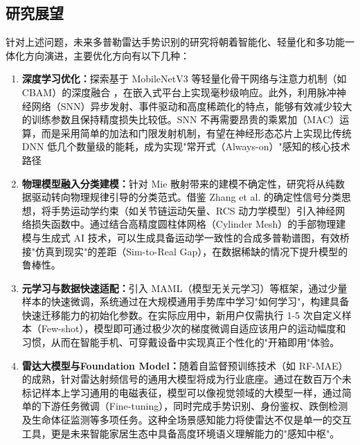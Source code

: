 \subsection{研究展望}
针对上述问题，未来多普勒雷达手势识别的研究将朝着智能化、轻量化和多功能一体化方向演进，主要优化方向有以下几种：
\begin{enumerate}
    \item \textbf{深度学习优化：}探索基于 MobileNetV3 等轻量化骨干网络与注意力机制（如 CBAM）的深度融合 ，在嵌入式平台上实现毫秒级响应。此外，利用脉冲神经网络（SNN）异步发射、事件驱动和高度稀疏化的特点，能够有效减少较大的训练参数且保持精度损失比较低。SNN 不再需要昂贵的乘累加（MAC）运算，而是采用简单的加法和门限发射机制，有望在神经形态芯片上实现比传统 DNN 低几个数量级的能耗，成为实现"常开式（Always-on）"感知的核心技术路径
    \item \textbf{物理模型融入分类建模：}针对 Mie 散射带来的建模不确定性，研究将从纯数据驱动转向物理规律引导的分类范式。借鉴 Zhang et al. 的确定性信号分类思想，将手势运动学约束（如关节链运动矢量、RCS 动力学模型）引入神经网络损失函数中。通过结合高精度圆柱体网格（Cylinder Mesh）的手部物理建模与生成式 AI 技术，可以生成具备运动学一致性的合成多普勒谱图，有效桥接"仿真到现实"的差距（Sim-to-Real Gap），在数据稀缺的情况下提升模型的鲁棒性。
    \item \textbf{元学习与数据快速适配：}引入 MAML\cite{MAML}（模型无关元学习）等框架，通过少量样本的快速微调，系统通过在大规模通用手势库中学习"如何学习"，构建具备快速迁移能力的初始化参数。在实际应用中，新用户仅需执行 1-5 次自定义样本（Few-shot），模型即可通过极少次的梯度微调自适应该用户的运动幅度和习惯，从而在智能手机、可穿戴设备中实现真正个性化的"开箱即用"体验。
    \item \textbf{雷达大模型与Foundation Model：}随着自监督预训练技术（如 RF-MAE）的成熟，针对雷达射频信号的通用大模型将成为行业底座。通过在数百万个未标记样本上学习通用的电磁表征，模型可以像视觉领域的大模型一样，通过简单的下游任务微调（Fine-tuning），同时完成手势识别、身份鉴权、跌倒检测及生命体征监测等多项任务。这种全场景感知能力将使雷达不仅是单一的交互工具，更是未来智能家居生态中具备高度环境语义理解能力的"感知中枢"。
\end{enumerate}

